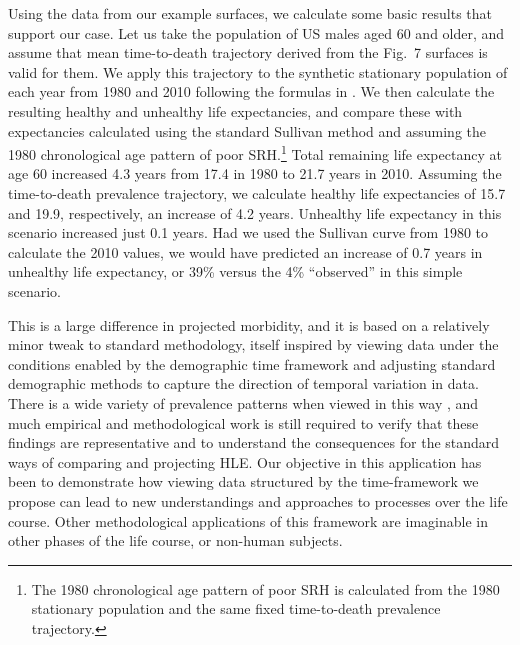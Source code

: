 \documentclass{bmcart}
\theoremstyle{definition}
\begin{document}
Using the data from our example surfaces, we calculate some basic results that support our case. Let us take the population of US males aged 60 and older, and
assume that mean time-to-death trajectory derived from the
Fig.~7 surfaces is valid for them.
We apply this trajectory to the synthetic stationary population of each
year from 1980 and 2010 \citep{HMD} following the formulas in
\cite{vanRaalte2015HLE}. We then calculate the resulting healthy and unhealthy
life expectancies, and compare these with expectancies calculated using the
standard Sullivan method and assuming the 1980 chronological age
pattern of poor SRH.\footnote{The 1980 chronological age pattern of poor SRH is
calculated from the 1980 stationary population and the same fixed time-to-death
prevalence trajectory.} Total remaining life expectancy at
age 60 increased 4.3 years from 17.4 in 1980 to 21.7 years in 2010.
Assuming the time-to-death prevalence trajectory, we calculate
healthy life expectancies of 15.7 and 19.9, respectively, an increase of 4.2 years. Unhealthy life expectancy in this scenario increased just 0.1 years. Had we used the Sullivan curve from 1980 to
calculate the 2010 values, we would have predicted an increase of 0.7 years in
unhealthy life expectancy, or 39\% versus the 4\% ``observed'' in this simple
scenario.

This is a large difference in projected morbidity, and it is based on a
relatively minor tweak to standard methodology, itself inspired by viewing data under the conditions
enabled by the demographic time framework and adjusting standard demographic
methods to capture the direction of temporal variation in data. There is a wide variety
of prevalence patterns when viewed in this way \citep{riffe2016ttd,
wolf2015disability}, and much empirical and methodological work is still required to verify
that these findings are representative and to understand the consequences for
the standard ways of comparing and projecting HLE. Our objective in this application has been
to demonstrate how viewing data structured by the
time-framework we propose can lead to new understandings and approaches to
processes over the life course. Other methodological applications of this
framework are imaginable in other phases of the life course, or non-human
subjects.
\end{document}
